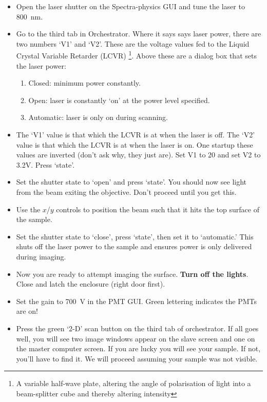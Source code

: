 \documentclass[paper=a4, fontsize=11pt]{scrartcl} %
\numberwithin{equation}{section} %
\numberwithin{figure}{section} %
\numberwithin{table}{section} %
\begin{document}
\begin{itemize}
\item Open the laser shutter on the Spectra-physics GUI and tune the laser to 800~nm.
\item Go to the third tab in Orchestrator. Where it says says laser power, there are two numbers `V1' and `V2'. These are
the voltage values fed to the Liquid Crystal Variable Retarder (LCVR) \footnote{A variable half-wave plate, altering the angle 
of polarisation of light into a beam-splitter cube and thereby altering intensity}. Above these are a dialog box that sets the
laser power:
\begin{enumerate}
\item Closed: minimum power constantly.
\item Open: laser is constantly `on' at the power level specified.
\item Automatic: laser is only on during scanning. 
\end{enumerate} 

\item The `V1' value is that which the LCVR is at when the laser is off. The `V2' value is that which the LCVR is at when
the laser is on. One startup these values are inverted (don't ask why, they just are). Set V1 to 20 and set V2 to 3.2V. 
Press `state'.

\item Set the shutter state to `open' and press `state'. You should now see light from the beam exiting the objective. 
Don't proceed until you get this.

\item Use the $x$/$y$ controls to position the beam such that it hits the top surface of the sample. 

\item Set the shutter state to `close', press `state', then set it to `automatic.' This shuts off the laser power to the sample 
and ensures power is only delivered during imaging. 

\item Now you are ready to attempt imaging the surface.
 \textbf{Turn off the lights}. 
 Close and latch the enclosure (right door first).

\item Set the gain to 700~V in the PMT GUI. Green lettering indicates the PMTs are on! 

\item Press the green `2-D' scan button on the third tab of orchestrator. If all goes well, you will see two image windows appear 
on the slave screen and one on the master computer screen. If you are lucky you will see your sample. If not, you'll have to find it. 
We will  proceed assuming your sample was not visible. 


\end{itemize}
\end{document}

